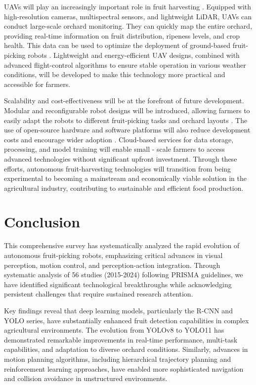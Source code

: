 \documentclass[pdflatex,sn-mathphys-num]{sn-jnl}
\begin{document}
UAVs will play an increasingly important role in fruit harvesting \cite{mohamed2021smart, martos2021ensuring}. Equipped with high-resolution cameras, multispectral sensors, and lightweight LiDAR, UAVs can conduct large-scale orchard monitoring. They can quickly map the entire orchard, providing real-time information on fruit distribution, ripeness levels, and crop health. This data can be used to optimize the deployment of ground-based fruit-picking robots \cite{martos2021ensuring}. Lightweight and energy-efficient UAV designs, combined with advanced flight-control algorithms to ensure stable operation in various weather conditions, will be developed to make this technology more practical and accessible for farmers.

Scalability and cost-effectiveness will be at the forefront of future development. Modular and reconfigurable robot designs will be introduced, allowing farmers to easily adapt the robots to different fruit-picking tasks and orchard layouts \cite{lytridis2021overview, li2023multi}. The use of open-source hardware and software platforms will also reduce development costs and encourage wider adoption \cite{zhang2024automatic}. Cloud-based services for data storage, processing, and model training will enable small - scale farmers to access advanced technologies without significant upfront investment. Through these efforts, autonomous fruit-harvesting technologies will transition from being experimental to becoming a mainstream and economically viable solution in the agricultural industry, contributing to sustainable and efficient food production.



\section{Conclusion}
This comprehensive survey has systematically analyzed the rapid evolution of autonomous fruit-picking robots, emphasizing critical advances in visual perception, motion control, and perception-action integration. Through systematic analysis of 56 studies (2015-2024) following PRISMA guidelines, we have identified significant technological breakthroughs while acknowledging persistent challenges that require sustained research attention.

Key findings reveal that deep learning models, particularly the R-CNN and YOLO series, have substantially enhanced fruit detection capabilities in complex agricultural environments. The evolution from YOLOv8 to YOLO11 has demonstrated remarkable improvements in real-time performance, multi-task capabilities, and adaptation to diverse orchard conditions. Similarly, advances in motion planning algorithms, including hierarchical trajectory planning and reinforcement learning approaches, have enabled more sophisticated navigation and collision avoidance in unstructured environments.
\end{document}

